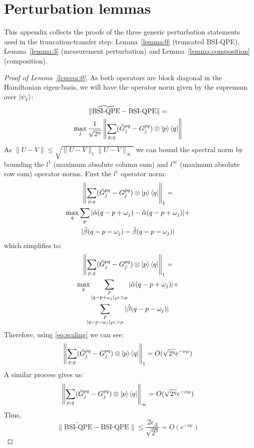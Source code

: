 \documentclass[aps,floatfix,10pt,amssymb,amsfont,amsmath,superscriptaddress,float,nofootinbib,longbibliography,nobalancelastpage,twocolumn]{revtex4-2}
\begin{document}
\section{Perturbation lemmas}
\label{app:perturbation}
This appendix collects the proofs of the three generic perturbation statements used in the truncation-transfer step: Lemma~\ref{lemma:0} (truncated BSI-QPE), Lemma~\ref{lemma:3} (measurement perturbation) and Lemma~\ref{lemma:composition} (composition).
\begin{proof}[Proof of Lemma~\ref{lemma:0}]
    As both operators are block diagonal in the Hamiltonian eigen-basis, we will have the operator norm given by the supremum over $\ket{\psi_j}$:
    \begin{multline}
        \|\widetilde{\text{BSI-QPE}}-\text{BSI-QPE}\| =\\ \max_j\frac{1}{\sqrt{2^{\eta}}} 
        \left\|\sum_{p,q}(\tilde G^{pq}_j - G^{pq}_j) \otimes \ket{p}\bra{q}\right\|
    \end{multline}
    As $\|U-V\| \leq \sqrt{\|U-V\|_{1}\|U-V\|_{\infty}}$ we can bound the spectral norm by bounding the $l^1$ (maximum absolute column sum) and $l^{\infty}$ (maximum absolute row sum) operator norms. First the $l^1$ operator norm:
    \begin{multline}
         \left\|\sum_{p,q}(\tilde G^{pq}_j - G^{pq}_j) \otimes \ket{p}\bra{q}\right\|_1 =\\ \max_q\sum_{p}|\tilde\alpha(q-p+\omega_{j})-\hat\alpha(q-p+\omega_{j})|+\\|\tilde\beta (q-p-\omega_{j})-\hat\beta (q-p-\omega_{j})|
    \end{multline}
    which simplifies to:
    \begin{multline}
         \left\|\sum_{p,q}(\tilde G^{pq}_j - G^{pq}_j) \otimes \ket{p}\bra{q}\right\|_1 =\\ \max_q\sum_{\substack{p\\|q-p+\omega_{j}|_{2^{\eta}}>\mu}}|\hat\alpha(q-p+\omega_{j})|+\\\sum_{\substack{p\\|q-p-\omega_{j}|_{2^{\eta}}>\mu}}|\hat\beta (q-p-\omega_{j})|
    \end{multline}
    Therefore, using \eqref{eq:scaling} we can see:
    \begin{equation}
        \left\|\sum_{p,q}(\tilde G^{pq}_j - G^{pq}_j) \otimes \ket{p}\bra{q}\right\|_1 = O(\sqrt{2^{\eta}}e^{-\nu \mu})
    \end{equation}
    A similar process gives us:
    \begin{equation}
        \left\|\sum_{p,q}(\tilde G^{pq}_j - G^{pq}_j) \otimes \ket{p}\bra{q}\right\|_{\infty} =O(\sqrt{2^{\eta}}e^{-\nu \mu})
    \end{equation}
    Thus,
    \begin{equation}
        \|\widetilde{\text{BSI-QPE}}-\text{BSI-QPE}\| \leq \frac{2\epsilon_{\Delta}}{\sqrt{2^{\eta}}} = O\left(e^{-\nu \mu}\right)
    \end{equation}
\end{proof}
\end{document}
